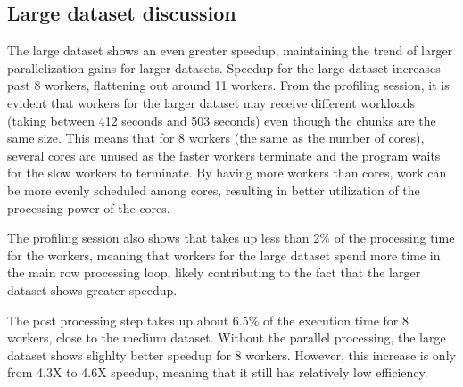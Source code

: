 \subsection{Large dataset discussion}
The large dataset shows an even greater speedup, maintaining the trend of larger parallelization gains for larger datasets. Speedup for the large
dataset increases past 8 workers, flattening out around 11 workers. From the profiling session, it is evident that workers for the larger dataset
may receive different workloads (taking between 412 seconds and 503 seconds) even though the chunks are the same size. This means that for 8 workers
(the same as the number of cores), several cores are unused as the faster workers terminate and the program waits for the slow workers to terminate.
By having more workers than cores, work can be more evenly scheduled among cores, resulting in better utilization of the processing power of the cores.

The profiling session also shows that  takes up less than 2\% of the processing time for the workers, meaning that workers for the large
dataset spend more time in the main row processing loop, likely contributing to the fact that the larger dataset shows greater speedup.

The post processing step takes up about 6.5\% of the execution time for 8 workers, close to the medium dataset. Without the parallel processing,
the large dataset shows slighlty better speedup for 8 workers. However, this increase is only from 4.3X to 4.6X speedup, meaning that it still has
relatively low efficiency.



